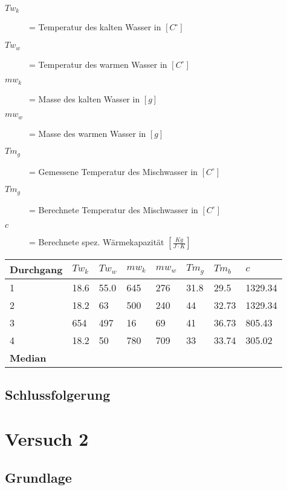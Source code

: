 \documentclass{article}
\begin{document}
  \begin{description}
    \item[\textbf{ $Tw_k$}]= Temperatur des kalten Wasser in $[C^\circ]$
    \item[\textbf{ $Tw_w$}]= Temperatur des warmen Wasser in $[C^\circ]$
    \item[\textbf{ $mw_k$}]= Masse des kalten Wasser in $[g]$
    \item[\textbf{ $mw_w$}]= Masse des warmen Wasser in $[g]$
    \item[\textbf{ $Tm_g$}]= Gemessene Temperatur des Mischwasser in  $[C^\circ]$
    \item[\textbf{ $Tm_g$}]= Berechnete Temperatur des Mischwasser in  $[C^\circ]$
    \item[\textbf{ $c$}]=  Berechnete spez. Wärmekapazität  $[\frac{Kg}{J \cdot K}]$
    
  \end{description}
\begin{table}[h]
    \begin{tabular}{|l|l|l|l|l|l|l|l|}
    
        \hline
        \textbf{Durchgang} &\textbf{$Tw_k$} &\textbf{$Tw_w$}& \textbf{$mw_k$}&\textbf{$mw_w$}&\textbf{$Tm_g$}&\textbf{$Tm_b$}&\textbf{$c$}\\ \hline
        1         & 18.6 & 55.0 & 645& 276 & 31.8 &29.5&1329.34\\ 
        2         & 18.2 & 63 &500 &240  & 44 &32.73&1329.34\\ 
        3         & 654 & 497 &16  &69  &41 &36.73&805.43\\ 
        4         &  18.2  &50 & 780 & 709 &33&33.74&305.02\\ \hline
        \textbf{Median}         &&&  &  & && \\ 
        \hline
    \end{tabular}
\end{table}

\subsection*{Schlussfolgerung}

\section{Versuch 2}
\subsection{Grundlage}
\end{document}
